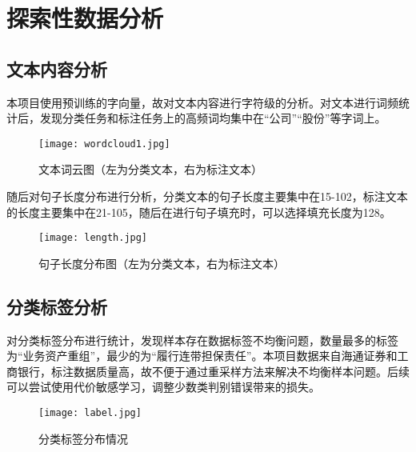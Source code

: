 \documentclass[letterpaper]{article}
\begin{document}
\section{探索性数据分析}
  \subsection{文本内容分析}
  本项目使用预训练的字向量，故对文本内容进行字符级的分析。对文本进行词频统计后，发现分类任务和标注任务上的高频词均集中在“公司”“股份”等字词上。
  
  \begin{figure}[h]
    \centering
    \texttt{[image: wordcloud1.jpg]}
    \caption{文本词云图（左为分类文本，右为标注文本）}
  \end{figure}

  随后对句子长度分布进行分析，分类文本的句子长度主要集中在15-102，标注文本的长度主要集中在21-105，随后在进行句子填充时，可以选择填充长度为128。

  \begin{figure}[h]
    \centering
    \texttt{[image: length.jpg]}
    \caption{句子长度分布图（左为分类文本，右为标注文本）}
  \end{figure}

  \subsection{分类标签分析}
  对分类标签分布进行统计，发现样本存在数据标签不均衡问题，数量最多的标签为“业务资产重组”，最少的为“履行连带担保责任”。本项目数据来自海通证券和工商银行，标注数据质量高，故不便于通过重采样方法来解决不均衡样本问题。后续可以尝试使用代价敏感学习，调整少数类判别错误带来的损失。
  \begin{figure}[h]
    \centering
    \texttt{[image: label.jpg]}
    \caption{分类标签分布情况}
  \end{figure}
\end{document}
